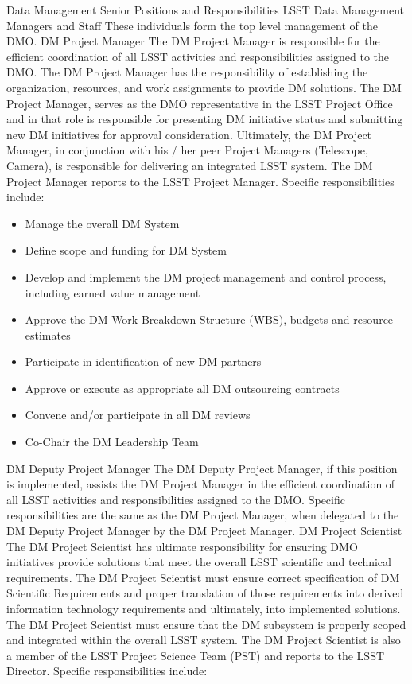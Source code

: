 \begin{itemize}
Data Management Senior Positions and Responsibilities
LSST Data Management Managers and Staff
These individuals form the top level management of the DMO.
DM Project Manager
The DM Project Manager is responsible for the efficient coordination of all LSST activities and responsibilities assigned to the DMO. The DM Project Manager has the responsibility of establishing the organization, resources, and work assignments to provide DM solutions.  The DM Project Manager, serves as the DMO representative in the LSST Project Office and in that role is responsible for presenting DM initiative status and submitting new DM initiatives for approval consideration. Ultimately, the DM Project Manager, in conjunction with his / her peer Project Managers (Telescope, Camera), is responsible for delivering an integrated LSST system. The DM Project Manager reports to the LSST Project Manager. Specific responsibilities include:

\begin{itemize}
\item Manage the overall DM System
\item Define scope and funding for DM System 
\item Develop and implement the DM project management and control process, including earned value management
\item Approve the DM Work Breakdown Structure (WBS), budgets and resource estimates
\item Participate in identification of new DM partners 
\item Approve or execute as appropriate all DM outsourcing contracts 
\item Convene and/or participate in all DM reviews
\item Co-Chair the DM Leadership Team
\end{itemize}
DM Deputy Project Manager
The DM Deputy Project Manager, if this position is implemented, assists the DM Project Manager in the efficient coordination of all LSST activities and responsibilities assigned to the DMO.  Specific responsibilities are the same as the DM Project Manager, when delegated to the DM Deputy Project Manager by the DM Project Manager.
DM Project Scientist
The DM Project Scientist has ultimate responsibility for ensuring DMO initiatives provide solutions that meet the overall LSST scientific and technical requirements.  The DM Project Scientist must ensure correct specification of DM Scientific Requirements and proper translation of those requirements into derived information technology requirements and ultimately, into implemented solutions.  The DM Project Scientist must ensure that the DM subsystem is properly scoped and integrated within the overall LSST system.  The DM Project Scientist is also a member of the LSST Project Science Team (PST) and reports to the LSST Director. Specific responsibilities include:


\end{itemize}
